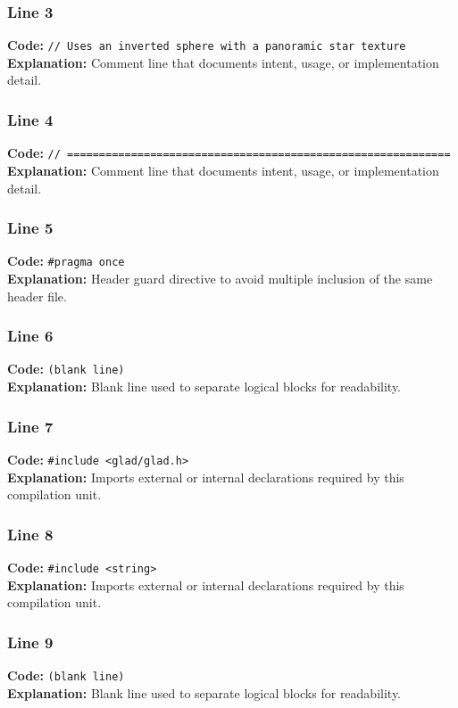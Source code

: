 \documentclass[11pt,a4paper]{article}
\begin{document}
\subsubsection*{Line 3}
\textbf{Code:} \verb|// Uses an inverted sphere with a panoramic star texture|\\
\textbf{Explanation:} Comment line that documents intent, usage, or implementation detail.

\subsubsection*{Line 4}
\textbf{Code:} \verb|// ============================================================|\\
\textbf{Explanation:} Comment line that documents intent, usage, or implementation detail.

\subsubsection*{Line 5}
\textbf{Code:} \verb|#pragma once|\\
\textbf{Explanation:} Header guard directive to avoid multiple inclusion of the same header file.

\subsubsection*{Line 6}
\textbf{Code:} \texttt{(blank line)}\\
\textbf{Explanation:} Blank line used to separate logical blocks for readability.

\subsubsection*{Line 7}
\textbf{Code:} \verb|#include <glad/glad.h>|\\
\textbf{Explanation:} Imports external or internal declarations required by this compilation unit.

\subsubsection*{Line 8}
\textbf{Code:} \verb|#include <string>|\\
\textbf{Explanation:} Imports external or internal declarations required by this compilation unit.

\subsubsection*{Line 9}
\textbf{Code:} \texttt{(blank line)}\\
\textbf{Explanation:} Blank line used to separate logical blocks for readability.
\end{document}
